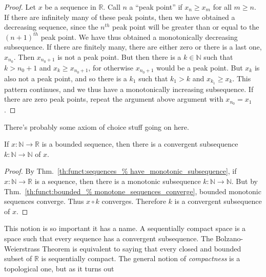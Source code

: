     \begin{proof}
        Let $x$ be a sequence in $\mathbb{R}$.
        Call $n$ a ``peak point'' if
        $x_{n}\geq{x_{m}}$ for all
        ${m}\geq{n}$. If there are infinitely many
        of these peak points, then we have obtained
        a decreasing sequence, since the $n^{th}$
        peak point will be greater than or equal to
        the $(n+1)^{th}$ peak point.
        We have thus obtained
        a monotonically decreasing subsequence.
        If there are finitely many,
        there are either zero or there is a last one,
        $x_{n_{0}}$. Then $x_{n_{0}+1}$ is not a
        peak point. But then there is a
        $k\in\mathbb{N}$ such that $k>n_{0}+1$ and
        $x_{k}\geq{x_{n_{0}+1}}$, for otherwise
        $x_{n_{0}+1}$ would be a peak point. But
        $x_{k}$ is also not a peak point, and so
        there is a $k_{1}$ such that $k_{1}>k$ and
        $x_{k_{1}}\geq{x_{k}}$. This pattern
        continues, and we thus have a monotonically
        increasing subsequence. If there are zero
        peak points, repeat the argument above
        argument with $x_{n_{0}}=x_{1}$.
    \end{proof}
    There's probably some axiom of choice stuff
    going on here.
    \begin{theorem}
        If $x:\mathbb{N}\rightarrow\mathbb{R}$
        is a bounded sequence, then there is
        a convergent subsequence
        $k:\mathbb{N}\rightarrow\mathbb{N}$
        of $x$.
    \end{theorem}
    \begin{proof}
        By Thm.~\ref{th:funct:sequences_%
                     have_monotonic_subsequence},
        if $x:\mathbb{N}\rightarrow\mathbb{R}$ is a
        sequence, then there is a monotonic subsequence
        $k:\mathbb{N}\rightarrow\mathbb{N}$.
        But by Thm.~\ref{th:funct:bounded_%
                         monotone_sequences_converge},
        bounded monotonic sequences converge.
        Thus $x\circ{k}$ converges.
        Therefore $k$ is a convergent
        subsequence of $x$.
    \end{proof}
    This notion is so important it has a name.
    A sequentially compact space is a space such that
    every sequence has a convergent subsequence. The
    Bolzano-Weierstrass Theorem is equivalent
    to saying that every closed and bounded subset
    of $\mathbb{R}$ is sequentially
    compact. The general notion of \textit{compactness}
    is a topological one, but as it turns out
